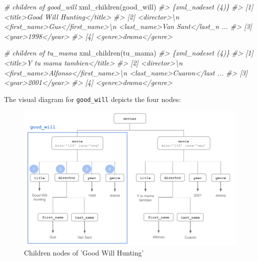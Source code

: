 \documentclass[
]{book}
\newenvironment{Shaded}{\begin{snugshade}}{\end{snugshade}}
\newcommand{\CommentTok}[1]{\textcolor[rgb]{0.56,0.35,0.01}{\textit{#1}}}
\newcommand{\FunctionTok}[1]{\textcolor[rgb]{0.00,0.00,0.00}{#1}}
\newcommand{\NormalTok}[1]{#1}
\begin{document}
\begin{Shaded}
\begin{Highlighting}[]
\CommentTok{\# children of good\_will}
\FunctionTok{xml\_children}\NormalTok{(good\_will)}
\CommentTok{\#\textgreater{} \{xml\_nodeset (4)\}}
\CommentTok{\#\textgreater{} [1] \textless{}title\textgreater{}Good Will Hunting\textless{}/title\textgreater{}}
\CommentTok{\#\textgreater{} [2] \textless{}director\textgreater{}\textbackslash{}n  \textless{}first\_name\textgreater{}Gus\textless{}/first\_name\textgreater{}\textbackslash{}n  \textless{}last\_name\textgreater{}Van Sant\textless{}/last\_n ...}
\CommentTok{\#\textgreater{} [3] \textless{}year\textgreater{}1998\textless{}/year\textgreater{}}
\CommentTok{\#\textgreater{} [4] \textless{}genre\textgreater{}drama\textless{}/genre\textgreater{}}
\end{Highlighting}
\end{Shaded}

\begin{Shaded}
\begin{Highlighting}[]
\CommentTok{\# children of tu\_mama}
\FunctionTok{xml\_children}\NormalTok{(tu\_mama)}
\CommentTok{\#\textgreater{} \{xml\_nodeset (4)\}}
\CommentTok{\#\textgreater{} [1] \textless{}title\textgreater{}Y tu mama tambien\textless{}/title\textgreater{}}
\CommentTok{\#\textgreater{} [2] \textless{}director\textgreater{}\textbackslash{}n  \textless{}first\_name\textgreater{}Alfonso\textless{}/first\_name\textgreater{}\textbackslash{}n  \textless{}last\_name\textgreater{}Cuaron\textless{}/last ...}
\CommentTok{\#\textgreater{} [3] \textless{}year\textgreater{}2001\textless{}/year\textgreater{}}
\CommentTok{\#\textgreater{} [4] \textless{}genre\textgreater{}drama\textless{}/genre\textgreater{}}
\end{Highlighting}
\end{Shaded}

The visual diagram for \texttt{good\_will} depicts the four nodes:

\begin{figure}

{\centering \includegraphics[width=0.85\linewidth]{images/xml/xml-movies-tree3} 

}

\caption{Children nodes of 'Good Will Hunting'}\label{fig:unnamed-chunk-39}
\end{figure}
\end{document}
